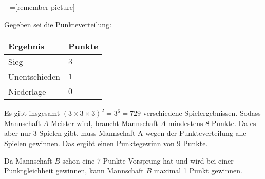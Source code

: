 \newcommand{\boxy}[2][yellow]{\mathchoice%
  {\pgfsetfillopacity{0.3}\colorbox{#1}{\pgfsetfillopacity{1}$\displaystyle#2$}}%
  {\pgfsetfillopacity{0.3}\colorbox{#1}{\pgfsetfillopacity{1}$\textstyle#2$}}%
  {\pgfsetfillopacity{0.3}\colorbox{#1}{\pgfsetfillopacity{1}$\scriptstyle#2$}}%
  {\pgfsetfillopacity{0.3}\colorbox{#1}{\pgfsetfillopacity{1}$\scriptscriptstyle#2$}}}%

\let\bnot\xoverline
\let\bnor\downarrow
\newcommand{\xorexpanded}[2]{\bnot{#1}#2 \lor #1\bnot{#2}}
\newcommand{\xor}[0]{\nleftrightarrow}
+=[remember picture]

\begin{enumerate}[label={[OH\arabic*]},start=8]
    \item 

        Gegeben sei die Punkteverteilung:
        \begin{center}
            \begin{tabular}{l l}
                \toprule
                Ergebnis & Punkte \\
                \midrule
                Sieg & $3$ \\ 
                Unentschieden & $1$ \\
                Niederlage & $0$ \\
                \bottomrule
            \end{tabular}
        \end{center}

        Es gibt insgesamt $(3 \times 3 \times 3)^2 = 3^6 = 729$ verschiedene Spielergebnissen. Sodass Mannschaft $A$ Meister wird, braucht Mannschaft $A$ mindestens $8$ Punkte. Da es aber nur 3 Spielen gibt, muss Mannschaft A wegen der Punkteverteilung alle Spielen gewinnen. Das ergibt einen Punktegewinn von $9$ Punkte.

        Da Mannschaft $B$ schon eine $7$ Punkte Vorsprung hat und wird bei einer Punktgleichheit gewinnen, kann Mannschaft $B$ maximal 1 Punkt gewinnen. 


\end{enumerate}
